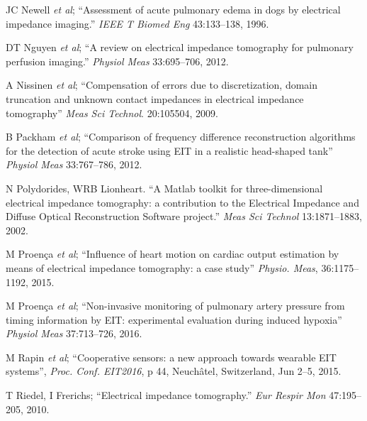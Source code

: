 \documentclass[12pt]{article} \usepackage[margin=3cm]{geometry} \usepackage[margin=20pt,font=small,labelfont=bf]{caption}\def\TBLWIDA{35mm}\def\TBLWIDB{95mm}
\newcommand{\ifmaxthree}[2]{#2 {\em et al}; }
\begin{document}
\begin{thebibliography}{00}
\ifmaxthree{
JC Newell, PM Edic, X Ren, JL Larson-Wiseman, MD Danyleiko,
}{
JC Newell
}
``Assessment of acute pulmonary edema in dogs by electrical impedance imaging.''
{\em  IEEE T Biomed Eng} 43:133--138, 1996.

\ifmaxthree{
DT Nguyen, C Jin, A Thiagalingam, AL McEwan
}{
DT Nguyen
}
``A review on electrical impedance tomography for pulmonary perfusion imaging.''
{\em Physiol Meas} 33:695--706, 2012.

\ifmaxthree{
A Nissinen, LM Heikkinen, V Kolehmainen, JP Kaipio
}{
A Nissinen
}
``Compensation of errors due to discretization, domain truncation and unknown contact impedances in electrical impedance tomography''
{\em  Meas Sci Technol}. 20:105504, 2009.

\ifmaxthree{
B Packham, H Koo, A Romsauerova, S Ahn, A McEwan, SC Jun, DS Holder,
}{
B Packham
}
``Comparison of frequency difference reconstruction algorithms for the detection of acute stroke using EIT in a realistic head-shaped tank''
{\em Physiol Meas} 33:767--786, 2012.



N Polydorides, WRB Lionheart. 
``A Matlab toolkit for three-dimensional electrical impedance tomography: a contribution to the Electrical Impedance and Diffuse Optical Reconstruction Software project.''
{\em Meas Sci Technol} 13:1871--1883, 2002.

\ifmaxthree{
M Proença, F Braun, M Rapin, J Solà, A Adler, B Grychtol, S Böhm, M Lemay, J-P Thiran,
}{
M Proença
}
``Influence of heart motion on cardiac output estimation by means of electrical impedance tomography: a case study''
{\em Physio. Meas}, 36:1175--1192, 2015.

\ifmaxthree{
M Proença, F Braun, J Solà, A Adler,
M Lemay, J-P Thiran, SF Rimoldi
}{
M Proença
}
``Non-invasive monitoring of pulmonary artery pressure from timing information by EIT: experimental evaluation during induced hypoxia''
{\em Physiol Meas} 37:713--726, 2016.

\ifmaxthree{
M Rapin, M Proença, F Braun, J Solà, O Chételat,
}{
M Rapin
}
``Cooperative sensors: a new approach towards wearable EIT systems'',
{\em Proc. Conf. EIT2016}, p 44, Neuchâtel, Switzerland, Jun 2--5, 2015.

T Riedel, I Frerichs;
``Electrical impedance tomography.''
{\em Eur  Respir  Mon} 47:195--205, 2010.


\end{thebibliography}
\end{document}
